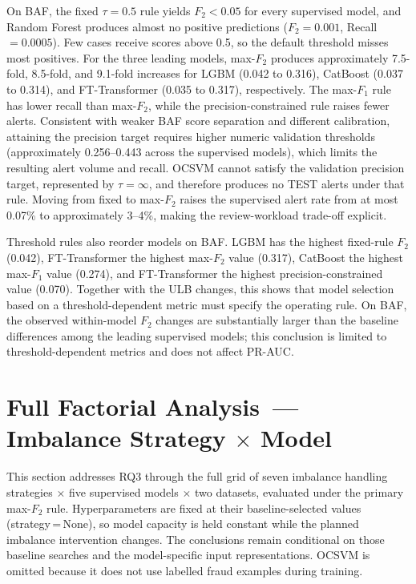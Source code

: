 On BAF, the fixed $\tau = 0.5$ rule yields $F_2 < 0.05$ for every supervised model, and Random Forest produces almost no positive predictions ($F_2 = 0.001$, Recall $= 0.0005$). Few cases receive scores above 0.5, so the default threshold misses most positives. For the three leading models, max-$F_2$ produces approximately 7.5-fold, 8.5-fold, and 9.1-fold increases for LGBM (0.042 to 0.316), CatBoost (0.037 to 0.314), and FT-Transformer (0.035 to 0.317), respectively. The max-$F_1$ rule has lower recall than max-$F_2$, while the precision-constrained rule raises fewer alerts. Consistent with weaker BAF score separation and different calibration, attaining the precision target requires higher numeric validation thresholds (approximately 0.256--0.443 across the supervised models), which limits the resulting alert volume and recall. OCSVM cannot satisfy the validation precision target, represented by $\tau=\infty$, and therefore produces no TEST alerts under that rule. Moving from fixed to max-$F_2$ raises the supervised alert rate from at most 0.07\% to approximately 3--4\%, making the review-workload trade-off explicit.

Threshold rules also reorder models on BAF. LGBM has the highest fixed-rule $F_2$ (0.042), FT-Transformer the highest max-$F_2$ value (0.317), CatBoost the highest max-$F_1$ value (0.274), and FT-Transformer the highest precision-constrained value (0.070). Together with the ULB changes, this shows that model selection based on a threshold-dependent metric must specify the operating rule. On BAF, the observed within-model $F_2$ changes are substantially larger than the baseline differences among the leading supervised models; this conclusion is limited to threshold-dependent metrics and does not affect PR-AUC.


\section{Full Factorial Analysis~--- Imbalance Strategy \texorpdfstring{$\times$}{x} Model}
\label{sec:factorial_results}

This section addresses RQ3 through the full grid of seven imbalance handling strategies $\times$ five supervised models $\times$ two datasets, evaluated under the primary max-$F_2$ rule. Hyperparameters are fixed at their baseline-selected values (strategy\,=\,None), so model capacity is held constant while the planned imbalance intervention changes. The conclusions remain conditional on those baseline searches and the model-specific input representations. OCSVM is omitted because it does not use labelled fraud examples during training.

